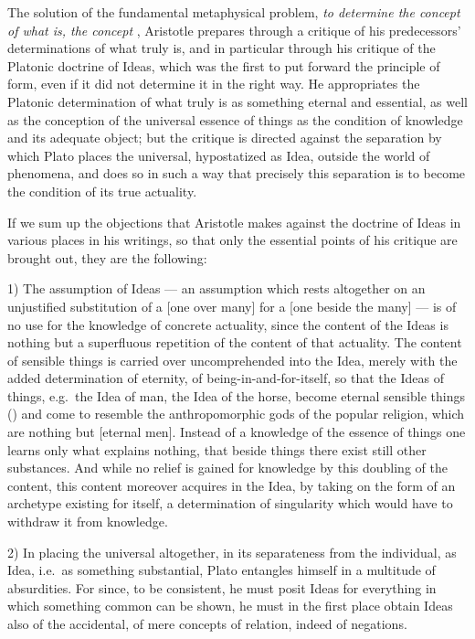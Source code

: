 The solution of the fundamental metaphysical problem, \emph{to determine the concept of what is, the concept }, Aristotle prepares through a critique of his predecessors'
determinations of what truly is, and in particular through
his critique of the Platonic doctrine of Ideas, which was the first to put forward
the principle of form, even if it did not determine it in the
right way. He appropriates the Platonic determination of
what truly is as something eternal and essential, as well as
the conception of the universal essence of things as the condition of knowledge
and its adequate object; but the critique is directed against the separation by which Plato places the universal, hypostatized as
Idea, outside the world of phenomena, and does so in such a way that precisely
this separation is to become the condition of its true actuality.

If we sum up the objections that Aristotle makes against the doctrine of Ideas in various places in his writings, so that only
the essential points of his critique are brought out, they are
the following:

1) The assumption of Ideas --- an assumption which rests altogether
on an unjustified substitution of a 
 [one over many] for a  [one beside the many] --- is of no use for
the knowledge of concrete actuality, since the content of the Ideas
is nothing but a superfluous repetition of the content of that actuality. The
content of sensible things is carried over uncomprehended into the Idea, merely
with the added determination of eternity, of being-in-and-for-itself, so
that the Ideas of things, e.g.\ the Idea of man, the Idea of the horse, become
eternal sensible things () and come to resemble the anthropomorphic gods of the popular religion, which are nothing but
 [eternal men]. Instead of a knowledge of the essence of things
one learns only what explains nothing, that beside
things there exist still other substances. And while
no relief is gained for knowledge by this doubling of the content, this content moreover acquires in
the Idea, by taking on the form of an archetype existing for itself,
a determination of singularity which would have to withdraw it from
knowledge.

2) In placing the universal altogether, in its separateness from the individual, as Idea, i.e.\ as something substantial, Plato entangles himself in a multitude of absurdities. For since,
to be consistent, he must posit Ideas for everything in which something common
can be shown, he must in the first place obtain Ideas also of the
accidental, of mere concepts of relation, indeed of negations.

